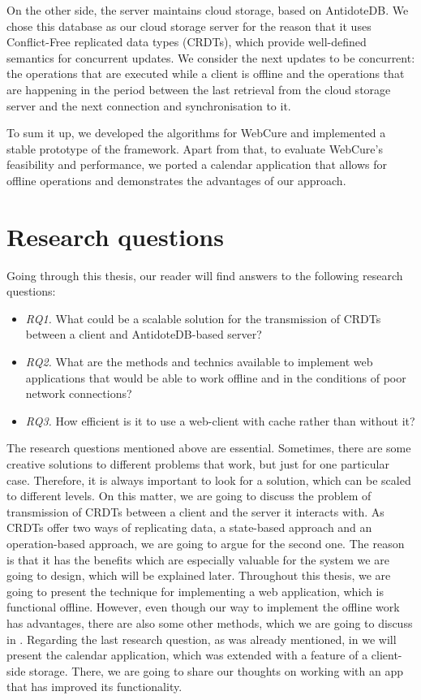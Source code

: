 On the other side, the server maintains cloud storage, based on AntidoteDB. We chose this database as our cloud storage server for the reason that it uses Conflict-Free replicated data types (CRDTs), which provide well-defined semantics for concurrent updates. We consider the next updates to be concurrent: the operations that are executed while a client is offline and the operations that are happening in the period between the last retrieval from the cloud storage server and the next connection and synchronisation to it. 

To sum it up, we developed the algorithms for WebCure and implemented a stable prototype of the framework. Apart from that, to evaluate WebCure's feasibility and performance, we ported a calendar application that allows for offline operations and demonstrates the advantages of our approach.

\section{Research questions}
\label{Introduction-Research}

Going through this thesis, our reader will find answers to the following research questions:

\begin{itemize}
    \item \textit{RQ1.} What could be a scalable solution for the transmission of CRDTs between a client and AntidoteDB-based server?
    \item \textit{RQ2.} What are the methods and technics available to implement web applications that would be able to work offline and
    in the conditions of poor network connections?
    \item \textit{RQ3.} How efficient is it to use a web-client with cache rather than without it?
  \end{itemize}

The research questions mentioned above are essential. Sometimes, there are some creative solutions to different problems that work, but just for one particular case. Therefore, it is always important to look for a solution, which can be scaled to different levels. On this matter, we are going to discuss the problem of transmission of CRDTs between a client and the server it interacts with. As CRDTs offer two ways of replicating data, a state-based approach and an operation-based approach, we are going to argue for the second one. The reason is that it has the benefits which are especially valuable for the system we are going to design, which will be explained later. Throughout this thesis, we are going to present the technique for implementing a web application, which is functional offline. However, even though our way to implement the offline work has advantages, there are also some other methods, which we are going to discuss in . Regarding the last research question, as was already mentioned, in  we will present the calendar application, which was extended with a feature of a client-side storage. There, we are going to share our thoughts on working with an app that has improved its functionality.

